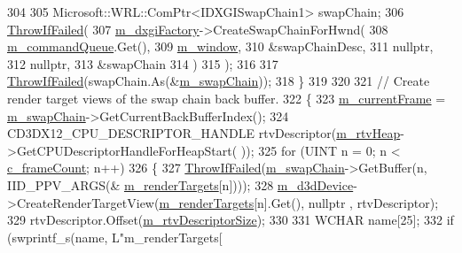 \begin{DoxyCode}
304 
305         Microsoft::WRL::ComPtr<IDXGISwapChain1> swapChain;
306         \mbox{\hyperlink{_direct_x_helper_8h_abca3eeca6b5772a1112e0a9a9e3d9013}{ThrowIfFailed}}(
307             \mbox{\hyperlink{class_d_x_1_1_device_resources_ab644f438ae69bde6c40c147dbda95928}{m\_dxgiFactory}}->CreateSwapChainForHwnd(
308                 \mbox{\hyperlink{class_d_x_1_1_device_resources_a0f0882523aa09b109f3a7bc05ff01f46}{m\_commandQueue}}.Get(),
309                 \mbox{\hyperlink{class_d_x_1_1_device_resources_a71c1253aac157673ae385bf9d705584c}{m\_window}},
310                 &swapChainDesc,
311                 \textcolor{keyword}{nullptr},
312                 \textcolor{keyword}{nullptr},
313                 &swapChain
314             )
315         );
316 
317         \mbox{\hyperlink{_direct_x_helper_8h_abca3eeca6b5772a1112e0a9a9e3d9013}{ThrowIfFailed}}(swapChain.As(&\mbox{\hyperlink{class_d_x_1_1_device_resources_a8f067c81561cd51ac8e59a89e868571b}{m\_swapChain}}));
318     \}
319 
320 
321     \textcolor{comment}{// Create render target views of the swap chain back buffer.}
322     \{
323         \mbox{\hyperlink{class_d_x_1_1_device_resources_ac5373e60722eaa25c1068aa754b501fa}{m\_currentFrame}} = \mbox{\hyperlink{class_d_x_1_1_device_resources_a8f067c81561cd51ac8e59a89e868571b}{m\_swapChain}}->GetCurrentBackBufferIndex();
324         CD3DX12\_CPU\_DESCRIPTOR\_HANDLE rtvDescriptor(\mbox{\hyperlink{class_d_x_1_1_device_resources_a23433ca65c8264c961778b97a309ea6a}{m\_rtvHeap}}->GetCPUDescriptorHandleForHeapStart(
      ));
325         \textcolor{keywordflow}{for} (UINT n = 0; n < \mbox{\hyperlink{namespace_d_x_a13eecb6f150dc97fc5c7c8597377d0fb}{c\_frameCount}}; n++)
326         \{
327             \mbox{\hyperlink{_direct_x_helper_8h_abca3eeca6b5772a1112e0a9a9e3d9013}{ThrowIfFailed}}(\mbox{\hyperlink{class_d_x_1_1_device_resources_a8f067c81561cd51ac8e59a89e868571b}{m\_swapChain}}->GetBuffer(n, IID\_PPV\_ARGS(&
      \mbox{\hyperlink{class_d_x_1_1_device_resources_aa96cf4622c1a948b53dfd6f1a08a24cd}{m\_renderTargets}}[n])));
328             \mbox{\hyperlink{class_d_x_1_1_device_resources_ac883ca593d5c03fe20d5865cb033cee1}{m\_d3dDevice}}->CreateRenderTargetView(\mbox{\hyperlink{class_d_x_1_1_device_resources_aa96cf4622c1a948b53dfd6f1a08a24cd}{m\_renderTargets}}[n].Get(), \textcolor{keyword}{nullptr}
      , rtvDescriptor);
329             rtvDescriptor.Offset(\mbox{\hyperlink{class_d_x_1_1_device_resources_adc2a1e5cbd63c54ad5a2836348a33cb8}{m\_rtvDescriptorSize}});
330 
331             WCHAR name[25];
332             \textcolor{keywordflow}{if} (swprintf\_s(name, L\textcolor{stringliteral}{"m\_renderTargets[%
}
\end{DoxyCode}
